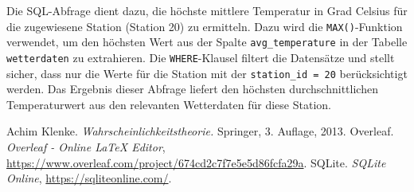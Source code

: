 \documentclass[a4paper,12pt]{article}
\begin{document}
Die SQL-Abfrage dient dazu, die höchste mittlere Temperatur in Grad Celsius für die zugewiesene Station (Station 20) zu ermitteln. Dazu wird die \texttt{MAX()}-Funktion verwendet, um den höchsten Wert aus der Spalte \texttt{avg\_temperature} in der Tabelle \texttt{wetterdaten} zu extrahieren. Die \texttt{WHERE}-Klausel filtert die Datensätze und stellt sicher, dass nur die Werte für die Station mit der \texttt{station\_id = 20} berücksichtigt werden. Das Ergebnis dieser Abfrage liefert den höchsten durchschnittlichen Temperaturwert aus den relevanten Wetterdaten für diese Station.




\newpage

\begin{thebibliography}{9}
Achim Klenke. \textit{Wahrscheinlichkeitstheorie.} Springer, 3. Auflage, 2013.
Overleaf. \textit{Overleaf - Online LaTeX Editor}, \url{https://www.overleaf.com/project/674cd2c7f7e5e5d86fcfa29a}.
SQLite. \textit{SQLite Online}, \url{https://sqliteonline.com/}.
\end{thebibliography}
\end{document}
